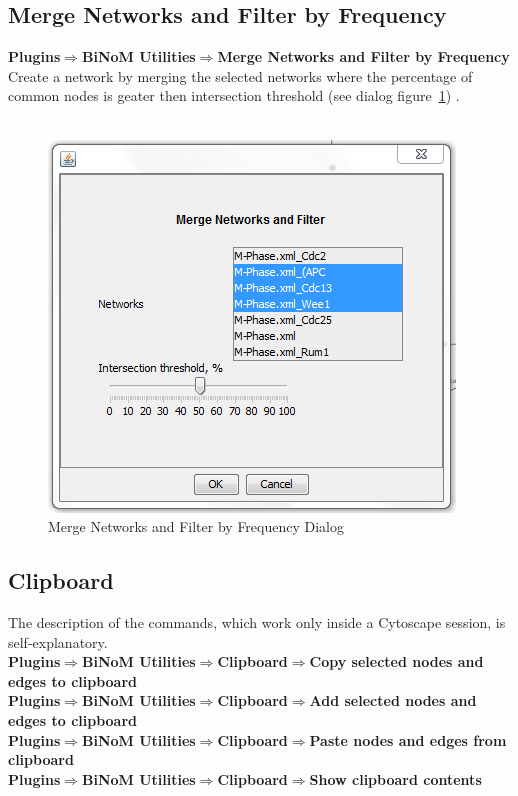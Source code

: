 \subsection{Merge Networks and Filter by Frequency}
\textbf{Plugins$\Rightarrow$BiNoM Utilities$\Rightarrow$Merge Networks and Filter by Frequency}\\
Create a network by merging the selected networks where the percentage of common nodes is geater then intersection threshold (see dialog figure~\ref{Merge_Networks_and_Filter}) .\\\\
\begin{figure}[h]
\centering
\includegraphics[width=12 cm]{graphics/Merge_Networks_and_Filter}
\caption{Merge Networks and Filter by Frequency Dialog}
\label{Merge_Networks_and_Filter}
\end{figure}

\subsection{Clipboard}
The description of the commands, which work only inside a Cytoscape session, is self-explanatory.\\
\textbf{Plugins$\Rightarrow$BiNoM Utilities$\Rightarrow$Clipboard$\Rightarrow$Copy selected nodes and edges to clipboard}\\
\textbf{Plugins$\Rightarrow$BiNoM Utilities$\Rightarrow$Clipboard$\Rightarrow$Add selected nodes and edges to clipboard}\\
\textbf{Plugins$\Rightarrow$BiNoM Utilities$\Rightarrow$Clipboard$\Rightarrow$Paste nodes and edges from clipboard}\\
\textbf{Plugins$\Rightarrow$BiNoM Utilities$\Rightarrow$Clipboard$\Rightarrow$Show clipboard contents}\\
